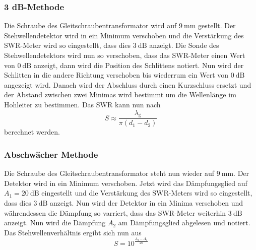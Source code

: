 \subsubsection{3 dB-Methode}
Die Schraube des Gleitschraubentransformator wird auf $\SI{9}{\milli\meter}$ gestellt.
Der Stehwellendetektor wird in ein Minimum verschoben und die Verstärkung des SWR-Meter wird so eingestellt, dass dies $\SI{3}{\dB}$ anzeigt.
Die Sonde des Stehwellendetektors wird nun so verschoben, dass das SWR-Meter einen Wert von $\SI{0}{\dB}$ anzeigt, dann wird die Position des Schlittens notiert.
Nun wird der Schlitten in die andere Richtung verschoben bis wiederrum ein Wert von $\SI{0}{\dB}$ angezeigt wird.
Danach wird der Abschluss durch einen Kurzschluss ersetzt und der Abstand zwischen zwei Minimas wird bestimmt um die Wellenlänge im Hohleiter zu bestimmen.
Das SWR kann nun nach 
\begin{equation}
    S \approx \frac{\lambda _\text{g}}{\pi \left ( d_1 - d_2 \right )}
    \label{eq:3db_SWR}
\end{equation}
berechnet werden.

\subsubsection{Abschwächer Methode}
\label{sec:abschwaecher_methode}
Die Schraube des Gleitschraubentransformator steht nun wieder auf $\SI{9}{\milli \meter}$.
Der Detektor wird in ein Minimum verschoben.
Jetzt wird das Dämpfungsglied auf $A_1 = \SI{20}{\dB}$ eingestellt und die Verstärkung des SWR-Meters wird so eingestellt, dass dies $\SI{3}{\dB}$ anzeigt.
Nun wird der Detektor in ein Minima verschoben und währendessen die Dämpfung so varriert, dass das SWR-Meter weiterhin $\SI{3}{\dB}$ anzeigt.
Nun wird die Dämpfung $A_2$ am Dämpfungsglied abgelesen und notiert.
Das Stehwellenverhältnis ergibt sich nun aus 
\begin{equation}
    S = 10^{\frac{A_2 -A_1}{20}}
    \label{eq:daempfung_SWR}
\end{equation}